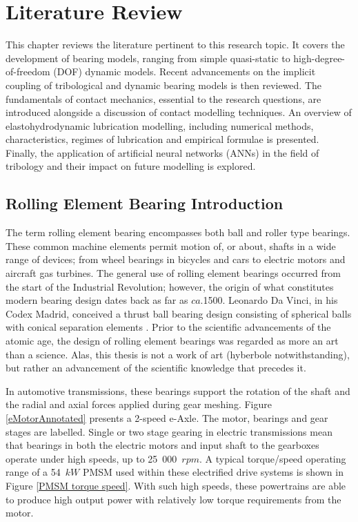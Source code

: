 \chapter{Literature Review}
\label{Literature Review}

This chapter reviews the literature pertinent to this research topic. It covers the development of bearing models, ranging from simple quasi-static to high-degree-of-freedom (DOF) dynamic models. Recent advancements on the implicit coupling of tribological and dynamic bearing models is then reviewed. The fundamentals of contact mechanics, essential to the research questions, are introduced alongside a discussion of contact modelling techniques. An overview of elastohydrodynamic lubrication modelling, including numerical methods, characteristics, regimes of lubrication and empirical formulae is presented. Finally, the application of artificial neural networks (ANNs) in the field of tribology and their impact on future modelling is explored.

\section{Rolling Element Bearing Introduction}

The term rolling element bearing encompasses both ball and roller type bearings. These common machine elements permit motion of, or about, shafts in a wide range of devices; from wheel bearings in bicycles and cars to electric motors and aircraft gas turbines. The general use of rolling element bearings occurred from the start of the Industrial Revolution; however, the origin of what constitutes modern bearing design dates back as far as $ca.$1500. Leonardo Da Vinci, in his Codex Madrid, conceived a thrust ball bearing design consisting of spherical balls with conical separation elements \cite{Harris2007}. Prior to the scientific advancements of the atomic age, the design of rolling element bearings was regarded as more an art than a science. Alas, this thesis is not a work of art (hyberbole notwithstanding), but rather an advancement of the scientific knowledge that precedes it.

In automotive transmissions, these bearings support the rotation of the shaft and the radial and axial forces applied during gear meshing. Figure \ref{eMotorAnnotated} presents a 2-speed e-Axle. The motor, bearings and gear stages are labelled.  Single or two stage gearing in electric transmissions mean that bearings in both the electric motors and input shaft to the gearboxes operate under high speeds, up to 25~000~$rpm$. A typical torque/speed operating range of a 54~$kW$ PMSM used within these electrified drive systems is shown in Figure \ref{PMSM torque speed}. With such high speeds, these powertrains are able to produce high output power with relatively low torque requirements from the motor.

